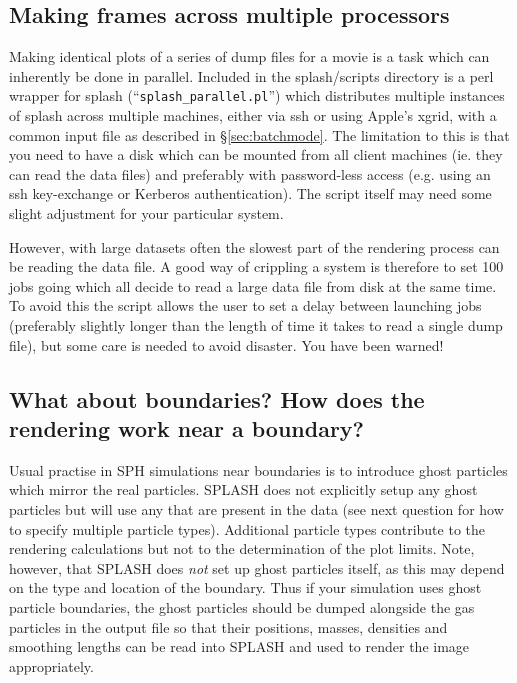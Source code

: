 \documentclass[a4paper,11pt]{article}
\begin{document}
\subsection{Making frames across multiple processors}
 Making identical plots of a series of dump files for a movie is a task which can inherently be done in parallel. Included in the splash/scripts directory is a perl wrapper for splash (``\verb+splash_parallel.pl+'') which distributes multiple instances of splash across multiple machines, either via ssh or using Apple's xgrid, with a common input file as described in \S\ref{sec:batchmode}. The limitation to this is that you need to have a disk which can be mounted from all client machines (ie. they can read the data files) and preferably with password-less access (e.g. using an ssh key-exchange or Kerberos authentication). The script itself may need some slight adjustment for your particular system.
 
However, with large datasets often the slowest part of the rendering process can be reading the data file. A good way of crippling a system is therefore to set 100 jobs going which all decide to read a large data file from disk at the same time. To avoid this the script allows the user to set a delay between launching jobs (preferably slightly longer than the length of time it takes to read a single dump file), but some care is needed to avoid disaster. You have been warned! 

\subsection{What about boundaries? How does the rendering work near a boundary?}
 Usual practise in SPH simulations near boundaries is
to introduce ghost particles which mirror the real particles. SPLASH does not
explicitly setup any ghost particles but will use any that are present in the data
(see next question for how to specify multiple particle types). Additional particle types contribute
to the rendering calculations but not to the determination of the plot limits. Note,
however, that SPLASH does \emph{not} set up ghost particles itself, as this may depend
on the type and location of the boundary. Thus if your simulation uses ghost particle
boundaries, the ghost particles should be dumped alongside the gas particles in the
output file so that their positions, masses, densities and smoothing lengths can be
read into SPLASH and used to render the image appropriately.
\end{document}
